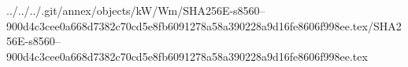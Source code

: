 ../../../.git/annex/objects/kW/Wm/SHA256E-s8560--900d4c3cee0a668d7382c70cd5e8fb6091278a58a390228a9d16fe8606f998ee.tex/SHA256E-s8560--900d4c3cee0a668d7382c70cd5e8fb6091278a58a390228a9d16fe8606f998ee.tex